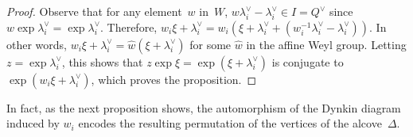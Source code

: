 \documentclass[pdftex]{sigma}
\numberwithin{equation}{section}
\begin{document}
\begin{proof}
Observe that for any element~$w$ in~$W$, $w \lambda_i^\vee - \lambda_i^\vee \in I= Q^\vee$ since $w\exp\lambda_i^\vee =
\exp \lambda_i^\vee$.
Therefore, $w_i \xi + \lambda_i^\vee = w_i(\xi + \lambda_i^\vee + (w_i^{-1}\lambda_i^\vee - \lambda_i^\vee))$.
In other words, $w_i \xi + \lambda_i^\vee = \hat{w}(\xi+\lambda_i^\vee)$ for some $\hat{w}$ in the af\/f\/ine Weyl group.
Letting $z=\exp\lambda_i^\vee$, this shows that $z \exp \xi = \exp(\xi+\lambda_i^\vee)$ is conjugate to $\exp(w_i \xi
+\lambda^\vee_i)$, which proves the proposition.
\end{proof}

In fact, as the next proposition shows, the automorphism of the Dynkin diagram induced by $w_i$ encodes the resulting
permutation of the vertices of the alcove~$\Delta$.
\end{document}
